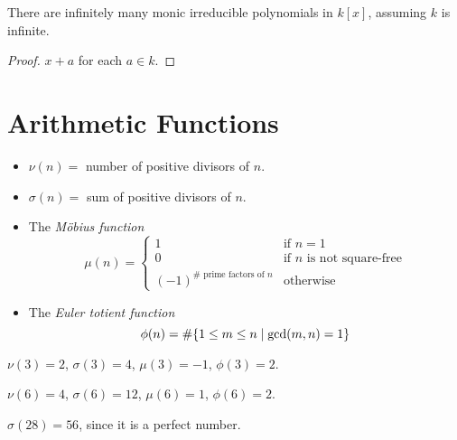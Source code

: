 \begin{exercise}
    There are infinitely many monic irreducible polynomials in $k[x]$,
    assuming $k$ is infinite.
\end{exercise}
\begin{proof}
    $x + a$ for each $a \in k$.
\end{proof}

\section{Arithmetic Functions} \label{sec:arithmetic_functions}
\begin{itemize}
    \item $\nu(n) =$ number of positive divisors of $n$.
    \item $\sigma(n) =$ sum of positive divisors of $n$.
    \item The \emph{M\"obius function} \[
        \mu(n) = \begin{cases}
            1 & \text{if } n = 1 \\
            0 & \text{if } n \text{ is not square-free} \\
            (-1)^{\# \text{ prime factors of } n} & \text{otherwise}
        \end{cases}
    \]
    \item The \emph{Euler totient function} \[
        \phi(n) = \# \set{1 \le m \le n \mid \gcd(m, n) = 1}
    \]
\end{itemize}
\begin{examples}
    \item $\nu(3) = 2$, $\sigma(3) = 4$, $\mu(3) = -1$, $\phi(3) = 2$.
    \item $\nu(6) = 4$, $\sigma(6) = 12$, $\mu(6) = 1$, $\phi(6) = 2$.
    \item $\sigma(28) = 56$, since it is a perfect number.
\end{examples}

